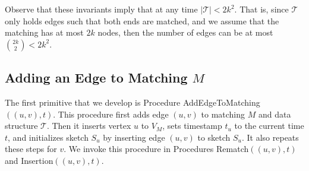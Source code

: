 \documentclass[11pt,letter]{article}
\newtheorem{lemma}[theorem]{Lemma}
\newcommand{\COMMENTED}[1]{{}}
\newcommand{\junk}[1]{\COMMENTED{#1}}
\begin{document}
\begin{center}
\end{center}

Observe that these invariants imply that at any time
$|\mathcal{T}| < 2k^2$.
That is, since $\mathcal{T}$ only holds edges such that both ends are
matched, and we assume that the matching has at most $2k$ nodes, then
the number of edges can be at most ${ {2k} \choose 2} < 2k^2$.

\junk{
\begin{lemma}
\label{lem:size:tree}
Suppose Invariant $3$ holds at a time $t$.
Then, at time $t$, we have $|\mathcal{T}|\le (2k)^2$.
\end{lemma}

\begin{proof}
At every time of stream $S$, for the size of a maximal matching $M$ we have $|M|\le k$.
Thus $|V_M|\le 2k$.
Using Invariant $3$, every edge $(u,v)$ at time $t$ is in $\mathcal{T}$ if
$u$ and $v$ are both matched. Therefore, $|\mathcal{T}|\le \frac{2k(2k+1)}{2}\le (2k)^2$
for $k>0$.
\end{proof}
}







\subsection{Adding an Edge to Matching $M$}
The first primitive that we develop is Procedure
{\sf AddEdgeToMatching$((u,v),t)$}.
This procedure first adds edge $(u,v)$ to matching $M$ and data structure $\mathcal{T}$.
Then it inserts vertex $u$ to $V_M$, sets timestamp $t_u$ to the current time
$t$, and initializes sketch $S_u$ by inserting
edge $(u,v)$ to sketch $S_u$.
It also repeats these steps for $v$.
We invoke this procedure in Procedures {\sf Rematch$((u,v),t)$}
and {\sf Insertion$((u,v), t)$}.
\end{document}
